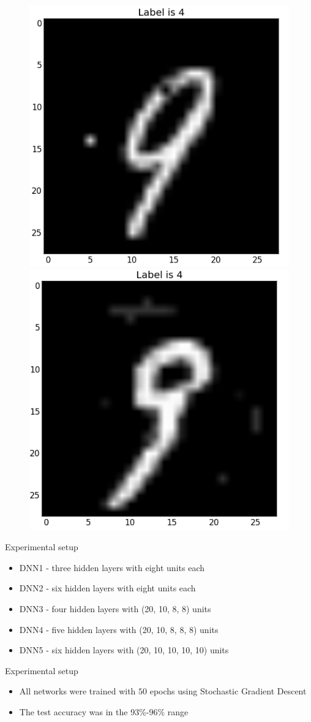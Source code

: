 \documentclass{beamer}
\begin{document}
\begin{frame}
  \begin{figure}
    \centering
    \includegraphics[width=0.48\columnwidth]{9-free.png}
    \includegraphics[width=0.48\columnwidth]{9-limited.png}
  \end{figure}
\end{frame}

\begin{frame}{Experimental setup}
  \begin{itemize}
  \item DNN1 - three hidden layers with eight units each
  \item DNN2 - six hidden layers with eight units each
  \item DNN3 - four hidden layers with (20, 10, 8, 8) units
  \item DNN4 - five hidden layers with (20, 10, 8, 8, 8) units
  \item DNN5 - six hidden layers with (20, 10, 10, 10, 10) units
  \end{itemize}
\end{frame}

\begin{frame}{Experimental setup}
  \begin{itemize}
  \item All networks were trained with $50$ epochs using Stochastic Gradient Descent
  \item The test accuracy was in the 93\%-96\% range
  \end{itemize}
\end{frame}
\end{document}
